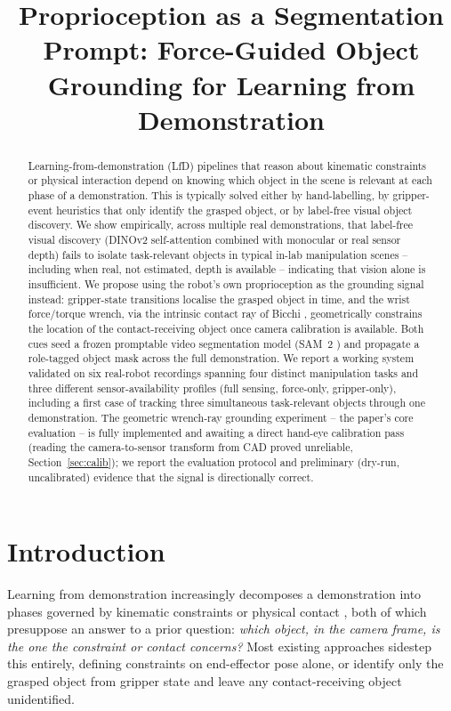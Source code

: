 \documentclass[letterpaper, 10pt, journal, twoside]{IEEEtran}
\title{Proprioception as a Segmentation Prompt: Force-Guided Object Grounding for Learning from Demonstration}
\begin{document}
\maketitle

\begin{abstract}
Learning-from-demonstration (LfD) pipelines that reason about kinematic
constraints or physical interaction depend on knowing which object in the
scene is relevant at each phase of a demonstration. This is typically
solved either by hand-labelling, by gripper-event heuristics that only
identify the grasped object, or by label-free visual object discovery. We
show empirically, across multiple real demonstrations, that label-free
visual discovery (DINOv2 self-attention combined with monocular or real
sensor depth) fails to isolate task-relevant objects in typical in-lab
manipulation scenes -- including when real, not estimated, depth is
available -- indicating that vision alone is insufficient. We propose
using the robot's own proprioception as the grounding signal instead:
gripper-state transitions localise the grasped object in time, and the
wrist force/torque wrench, via the intrinsic contact ray of Bicchi
\cite{bicchi1990}, geometrically constrains the location of the
contact-receiving object once camera calibration is available. Both cues
seed a frozen promptable video segmentation model (SAM~2
\cite{ravi2024sam2}) and propagate a role-tagged object mask across the
full demonstration. We report a working system validated on six
real-robot recordings spanning four distinct manipulation tasks and
three different sensor-availability profiles (full sensing, force-only,
gripper-only), including a first case of tracking three simultaneous
task-relevant objects through one demonstration. The geometric wrench-ray
grounding experiment -- the paper's core evaluation -- is fully
implemented and awaiting a direct hand-eye calibration pass (reading the
camera-to-sensor transform from CAD proved unreliable, Section~\ref{sec:calib});
we report the evaluation protocol and preliminary (dry-run, uncalibrated)
evidence that the signal is directionally correct.
\end{abstract}

\section{Introduction}

Learning from demonstration increasingly decomposes a demonstration into
phases governed by kinematic constraints \cite{overbeek2025frontiers} or
physical contact \cite{overbeek2025adrr}, both of which presuppose an
answer to a prior question: \emph{which object, in the camera frame, is
the one the constraint or contact concerns?} Most existing approaches
sidestep this entirely, defining constraints on end-effector pose alone,
or identify only the grasped object from gripper state and leave any
contact-receiving object unidentified.
\end{document}
